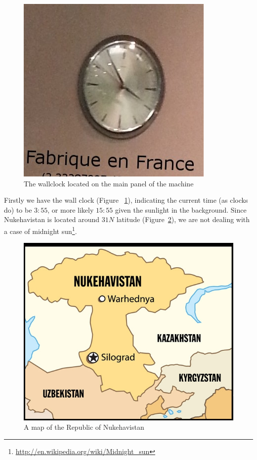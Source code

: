 \begin{figure}[h]
	\centering
	\includegraphics[width=0.8\columnwidth]{img/clock.jpg}
	\caption{The wallclock located on the main panel of the machine}
	\label{fig:clock}
\end{figure}

Firstly we have the wall clock (Figure ~\ref{fig:clock}), indicating the current time (as clocks do) to be $3:55$, or more likely $15:55$ given the sunlight in the background. Since Nukehavistan is located around $31N$ latitude (Figure~\ref{fig:map}), we are not dealing with a case of midnight sun\footnote{\url{http://en.wikipedia.org/wiki/Midnight_sun}}.

\begin{figure}
	\centering
	\includegraphics[width=0.8\columnwidth]{img/nukehavistan.jpg}
	\caption[A map of the Republic of Nukehavistan]{A map of the Republic of Nukehavistan \protect \footnotemark}
	\label{fig:map}
\end{figure}


